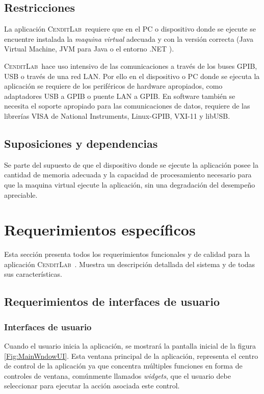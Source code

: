\documentclass[paper=a4,oneside,fontsize=12pt]{article}
\newcommand{\AppName}{\textsc{CenditLab}\ }
\begin{document}
	\subsection{Restricciones}	
	
	La aplicación \AppName requiere que en el PC o dispositivo donde se ejecute se encuentre instalada la \emph{maquina virtual} adecuada y con la versión correcta (Java Virtual Machine, JVM para Java o el entorno .NET ). 
	
	\AppName hace uso intensivo de las comunicaciones a través de los buses GPIB, USB o través de una red LAN. Por ello en el dispositivo o PC donde se ejecuta la aplicación se requiere de los periféricos de hardware apropiados, como adaptadores USB a GPIB o puente LAN a GPIB. En software también se necesita el soporte apropiado para las comunicaciones de datos, requiere de las librerías VISA de National Instruments, Linux-GPIB, VXI-11 y libUSB.	

	\subsection{Suposiciones y dependencias}	
	
	Se parte del supuesto de que el dispositivo donde se ejecute la aplicación posee la cantidad de memoria adecuada y la capacidad de procesamiento necesario para que la maquina virtual ejecute la aplicación, sin una degradación del desempeño apreciable.
	
	\section{Requerimientos específicos}
	
	Esta sección presenta todos los requerimientos funcionales y de calidad para la aplicación \AppName. Muestra un descripción detallada del sistema y de todas sus características.
	
	\subsection{Requerimientos de interfaces de usuario}
	
	\subsubsection{Interfaces de usuario}
	
	Cuando el usuario inicia la aplicación, se mostrará la pantalla inicial de la figura \ref{Fig:MainWndowUI}. Esta ventana principal de la aplicación, representa el centro de control de la aplicación ya que concentra múltiples funciones en forma de controles de ventana, comúnmente llamados \emph{widgets}, que el usuario debe seleccionar para ejecutar la acción asociada este control. 
	
\end{document}
